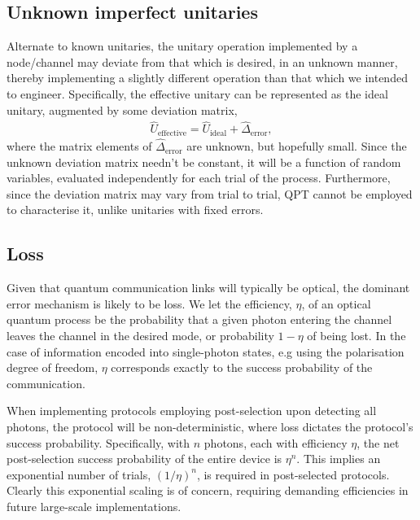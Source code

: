 \documentclass[aps, rmp, twocolumn, amsmath, amssymb, nofootinbib, superscriptaddress, longbibliography, floatfix, table-of-contents, eqsecnum]{revtex4-1}
\begin{document}
%
%

\subsection{Unknown imperfect unitaries} 

Alternate to known unitaries, the unitary operation implemented by a node/channel may deviate from that which is desired, in an unknown manner, thereby implementing a slightly different operation than that which we intended to engineer. Specifically, the effective unitary can be represented as the ideal unitary, augmented by some deviation matrix,
\begin{align}
	\hat{U}_\text{effective} = \hat{U}_\text{ideal} + \hat{\Delta}_\text{error},
\end{align}
where the matrix elements of $\hat{\Delta}_\text{error}$ are unknown, but hopefully small. Since the unknown deviation matrix needn't be constant, it will be a function of random variables, evaluated independently for each trial of the process. Furthermore, since the deviation matrix may vary from trial to trial, QPT cannot be employed to characterise it, unlike unitaries with fixed errors.

%
%

\subsection{Loss} \label{sec:eff_err} 

Given that quantum communication links will typically be optical, the dominant error mechanism is likely to be loss. We let the efficiency, $\eta$, of an optical quantum process be the probability that a given photon entering the channel leaves the channel in the desired mode, or probability \mbox{$1-\eta$} of being lost. In the case of information encoded into single-photon states, e.g using the polarisation degree of freedom, $\eta$ corresponds exactly to the success probability of the communication.

When implementing protocols employing post-selection upon detecting all photons, the protocol will be non-deterministic, where loss dictates the protocol's success probability. Specifically, with $n$ photons, each with efficiency $\eta$, the net post-selection success probability of the entire device is $\eta^n$. This implies an exponential number of trials, \mbox{$(1/\eta)^n$}, is required in post-selected protocols. Clearly this exponential scaling is of concern, requiring demanding efficiencies in future large-scale implementations.
\end{document}
